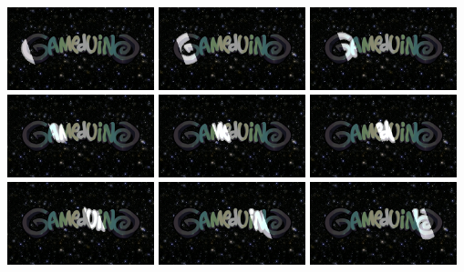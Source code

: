 \documentclass[10pt]{book}
\begin{document}
\begin{center}
\includegraphics[width=0.32\textwidth]{assets/slotgag/00.png}
\includegraphics[width=0.32\textwidth]{assets/slotgag/02.png}
\includegraphics[width=0.32\textwidth]{assets/slotgag/04.png}
\includegraphics[width=0.32\textwidth]{assets/slotgag/06.png}
\includegraphics[width=0.32\textwidth]{assets/slotgag/08.png}
\includegraphics[width=0.32\textwidth]{assets/slotgag/10.png}
\includegraphics[width=0.32\textwidth]{assets/slotgag/12.png}
\includegraphics[width=0.32\textwidth]{assets/slotgag/14.png}
\includegraphics[width=0.32\textwidth]{assets/slotgag/16.png}
\end{center}
\end{document}
